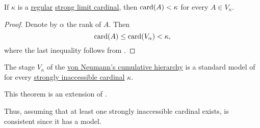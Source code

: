 \begin{corollary}\label{thm:strong_regular_cardinal_stage_cardinality}
  If \( \kappa \) is a \hyperref[def:regular_cardinal]{regular} \hyperref[def:successor_and_limit_cardinal/strong_limit]{strong limit cardinal}, then \( \operatorname{card}(A) < \kappa \) for every \( A \in V_\kappa \).
\end{corollary}
\begin{proof}
  Denote by \( \alpha \) the rank of \( A \). Then
  \begin{equation*}
    \operatorname{card}(A) \leq \operatorname{card}(V_\alpha) < \kappa,
  \end{equation*}
  where the last inequality follows from .
\end{proof}

\begin{theorem}\label{rem:cumulative_hierarchy_model_of_zfc}
  The stage \( V_\kappa \) of the \hyperref[def:cumulative_hierarchy]{von Neumann's cumulative hierarchy} is a standard model of  for every \hyperref[def:regular_cardinal]{strongly inaccessible cardinal} \( \kappa \).

  This theorem is an extension of .

  Thus, assuming that at least one strongly inaccessible cardinal exists,  is consistent since it has a model.
\end{theorem}

